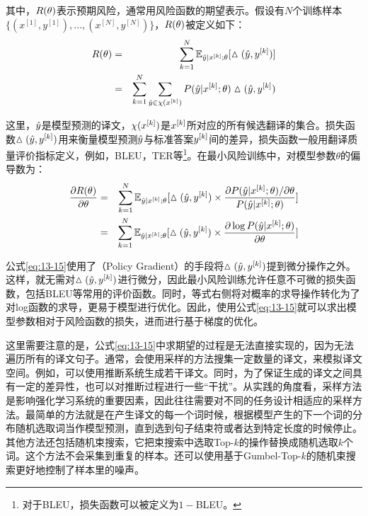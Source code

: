 \noindent 其中，${R}(\theta)$表示预期风险，通常用风险函数的期望表示。假设有$N$个训练样本$\{(x^{[1]},y^{[1]}),...,(x^{[N]},y^{[N]})\}$，${R}(\theta)$被定义如下：
\begin{eqnarray}
{R}(\theta) & = & \sum_{k=1}^N \mathbb{E}_{\hat{{y}}|{x}^{[k]};\theta}[\vartriangle(\hat{{y}},{y}^{[k]})] \nonumber \\
& = & \sum_{k=1}^N \sum_{\hat{{y}} \in \chi({x}^{[k]})}{P}(\hat{{y}}|{x}^{[k]};\theta)\vartriangle(\hat{{y}},{y}^{[k]})
\label{eq:13-14}
\end{eqnarray}

\noindent 这里，$\hat{{y}}$是模型预测的译文，$\chi({x}^{[k]})$是${x}^{[k]}$所对应的所有候选翻译的集合。损失函数$\vartriangle(\hat{{y}},{y}^{[k]})$用来衡量模型预测$\hat{{y}}$与标准答案${y}^{[k]}$间的差异，损失函数一般用翻译质量评价指标定义，例如，BLEU，TER等\footnote{对于BLEU，损失函数可以被定义为$1-$BLEU。}。在最小风险训练中，对模型参数$\theta$的偏导数为：
\begin{eqnarray}
\frac{\partial {R}(\theta)}{\partial \theta} & = & \sum_{k=1}^N \mathbb{E}_{\hat{{y}}|{x}^{[k]};\theta}[\vartriangle(\hat{{y}},{y}^{[k]}) \times \frac{\partial {P}(\hat{{y}}|{x}^{[k]};\theta)/\partial \theta}{{P}(\hat{{y}}|{x}^{[k]};\theta)}] \nonumber \\
& = & \sum_{k=1}^N \mathbb{E}_{\hat{{y}}|{x}^{[k]};\theta}[\vartriangle(\hat{{y}},{y}^{[k]}) \times \frac{\partial \log{{P}(\hat{{y}}|{x}^{[k]};\theta)}}{\partial \theta}]
\label{eq:13-15}
\end{eqnarray}

\noindent 公式\eqref{eq:13-15}使用了{\small{}}（Policy Gradient）的手段将$\vartriangle(\hat{{y}},{y}^{[k]})$提到微分操作之外。这样，就无需对$\vartriangle(\hat{{y}},{y}^{[k]})$进行微分，因此最小风险训练允许任意不可微的损失函数，包括BLEU等常用的评价函数。同时，等式右侧将对概率的求导操作转化为了对log函数的求导，更易于模型进行优化。因此，使用公式\eqref{eq:13-15}就可以求出模型参数相对于风险函数的损失，进而进行基于梯度的优化。

\parinterval 这里需要注意的是，公式\eqref{eq:13-15}中求期望的过程是无法直接实现的，因为无法遍历所有的译文句子。通常，会使用采样的方法搜集一定数量的译文，来模拟译文空间。例如，可以使用推断系统生成若干译文。同时，为了保证生成的译文之间具有一定的差异性，也可以对推断过程进行一些“干扰”。从实践的角度看，采样方法是影响强化学习系统的重要因素，因此往往需要对不同的任务设计相适应的采样方法。最简单的方法就是在产生译文的每一个词时候，根据模型产生的下一个词的分布随机选取词当作模型预测，直到选到句子结束符或者达到特定长度的时候停止。其他方法还包括随机束搜索，它把束搜索中选取Top-$k$的操作替换成随机选取$k$个词。这个方法不会采集到重复的样本。还可以使用基于Gumbel-Top-$k$的随机束搜索更好地控制了样本里的噪声。

